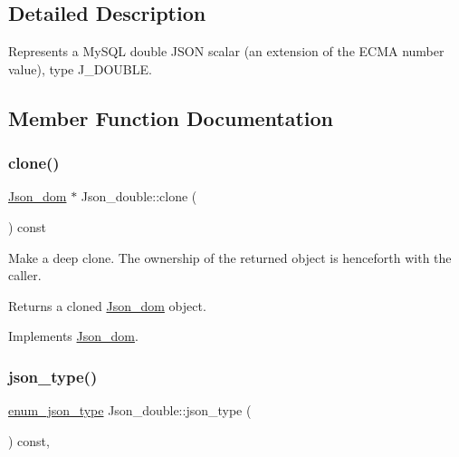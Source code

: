 \subsection{Detailed Description}
Represents a My\+S\+QL double J\+S\+ON scalar (an extension of the E\+C\+MA number value), type J\+\_\+\+D\+O\+U\+B\+LE. 

\subsection{Member Function Documentation}
\mbox{\label{classJson__double_a2df30c0e413cebf858b13b8ce2f9f91c}} 
\subsubsection{\texorpdfstring{clone()}{clone()}}
{\footnotesize\ttfamily \mbox{\hyperlink{classJson__dom}{Json\+\_\+dom}} $\ast$ Json\+\_\+double\+::clone (\begin{DoxyParamCaption}{ }\end{DoxyParamCaption}) const\hspace{0.3cm}{\ttfamily [virtual]}}

Make a deep clone. The ownership of the returned object is henceforth with the caller.

\begin{DoxyReturn}{Returns}
a cloned \mbox{\hyperlink{classJson__dom}{Json\+\_\+dom}} object. 
\end{DoxyReturn}


Implements \mbox{\hyperlink{classJson__dom_a03c529d590cc4cdb747ccb82f4b70fb5}{Json\+\_\+dom}}.

\mbox{\label{classJson__double_af10b0251a6a1bdc530a2a6928b2396b4}} 
\subsubsection{\texorpdfstring{json\+\_\+type()}{json\_type()}}
{\footnotesize\ttfamily \mbox{\hyperlink{classJson__dom_af37eed7dfe1da1d6507d3ab85320eb03}{enum\+\_\+json\+\_\+type}} Json\+\_\+double\+::json\+\_\+type (\begin{DoxyParamCaption}{ }\end{DoxyParamCaption}) const\hspace{0.3cm}{\ttfamily [inline]}, {\ttfamily [virtual]}}

